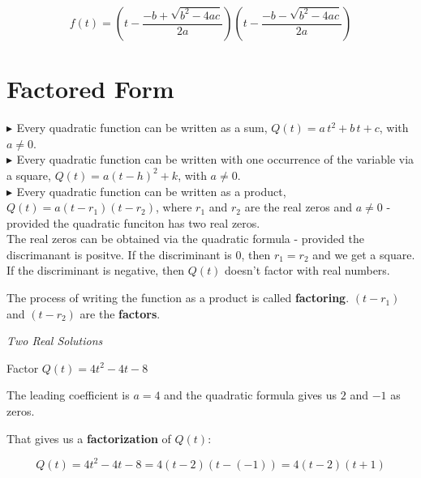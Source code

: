 \documentclass{ximera}
\begin{document}
\[ f(t) =  \left(t - \frac{-b + \sqrt{b^2 - 4 a c}}{2a}\right)   \left(t -  \frac{-b - \sqrt{b^2 - 4 a c}}{2a}\right)   \]







\section{Factored Form}

\textbf{\textcolor{red!90!darkgray}{$\blacktriangleright$ }} Every quadratic function can be written as a sum, $Q(t) = a \, t^2 + b \, t + c$, with $a \ne 0$. \\



\textbf{\textcolor{red!90!darkgray}{$\blacktriangleright$ }} Every quadratic function can be written with one occurrence of the variable via a square, $Q(t) = a (t - h)^2 + k$, with $a \ne 0$. \\



\textbf{\textcolor{red!90!darkgray}{$\blacktriangleright$ }} Every quadratic function can be written as a product, $Q(t) = a (t - r_1)(t - r_2)$, where $r_1$ and $r_2$ are the real zeros and $a \ne 0$ - provided the quadratic funciton has two real zeros. \\





The real zeros can be obtained via the quadratic formula - provided the discrimanant is positve.  If the discriminant is $0$, then $r_1 = r_2$ and we get a square.  If the discriminant is negative, then $Q(t)$ doesn't factor with real numbers.  


The process of writing the function as a product is called \textbf{factoring}. $(t - r_1)$  and $(t - r_2)$ are the \textbf{factors}.



\begin{example} \textit{Two Real Solutions} 

Factor $Q(t) = 4 t^2 - 4 t - 8$ 

\begin{explanation}

The leading coefficient is $a=4$ and the quadratic formula gives us $2$ and $-1$ as zeros.  

That gives us a \textbf{factorization} of $Q(t)$:



\[    Q(t) = 4 t^2 - 4 t - 8 =  4 (t-2)(t-(-1))    = 4 (t-2)(t+1)         \]

\end{explanation}

\end{example}
\end{document}
